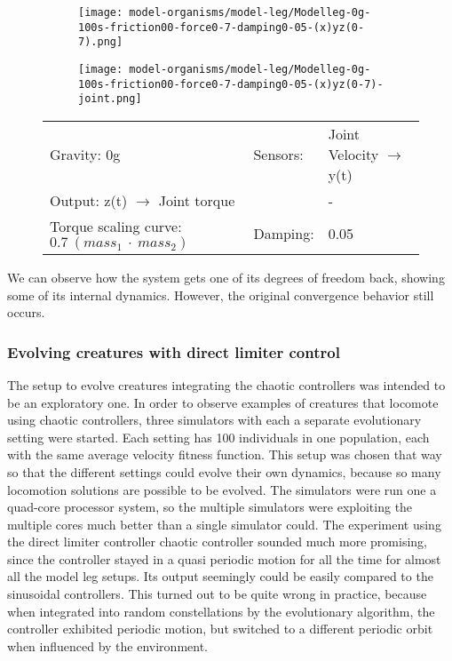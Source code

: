 \documentclass[main]{subfiles}
\begin{document}
\begin{figure}[H]
	\centering
		\begin{subfigure}[c]{0.45\textwidth}
	\texttt{[image: model-organisms/model-leg/Modelleg-0g-100s-friction00-force0-7-damping0-05-(x)yz(0-7).png]}
		\end{subfigure}
	\begin{subfigure}[c]{0.45\textwidth}
	\texttt{[image: model-organisms/model-leg/Modelleg-0g-100s-friction00-force0-7-damping0-05-(x)yz(0-7)-joint.png]}
		\end{subfigure}
	\caption[Limited chaotic controller controlling model leg]{}
	\begin{tabular}{l|ll}
	\hline 
	Gravity: 0g  & Sensors: & Joint Velocity \(\rightarrow\) y(t)\\
	 Output: z(t) \(\rightarrow\) Joint torque & & - \\
	  Torque scaling curve: \(0.7~(mass_1~\cdot~mass_2)\) & Damping: & 0.05 \\
	  \hline
	\end{tabular}

	\label{figure:limited-damped-model-leg8}
\end{figure}

We can observe how the system gets one of its degrees of freedom back, showing some of its internal dynamics. However, the original convergence behavior still occurs.


\subsubsection{Evolving creatures with direct limiter control}


The setup to evolve creatures integrating the chaotic controllers was intended to be an exploratory one. In order to observe examples of creatures that locomote using chaotic controllers, three simulators with each a separate evolutionary setting were started. Each setting has 100 individuals in one population, each with the same average velocity fitness function. This setup was chosen that way so that the different settings could evolve their own dynamics, because so many locomotion solutions are possible to be evolved. The simulators were run one a quad-core processor system, so the multiple simulators were exploiting the multiple cores much better than a single simulator could. The experiment using the direct limiter controller chaotic controller sounded much more promising, since the controller stayed in a quasi periodic motion for all the time for almost all the model leg setups. Its output seemingly could be easily compared to the sinusoidal controllers. This turned out to be quite wrong in practice, because when integrated into random constellations by the evolutionary algorithm, the controller exhibited periodic motion, but switched to a different periodic orbit when influenced by the environment. 
\end{document}
